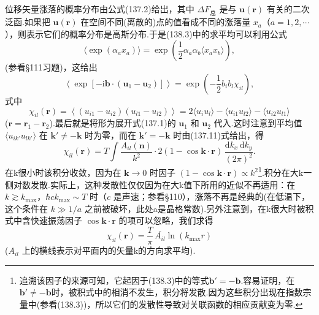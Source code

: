 位移矢量涨落的概率分布由公式(137.2)给出，其中 $\Delta F_{\text{总}}$ 是与 $\boldsymbol{u}(\boldsymbol{r})$ 有关的二次泛函.如果把 $\boldsymbol{u}(\boldsymbol{r})$ 在空间不同(离散的)点的值看成不同的涨落量 $x_a$（$a=1,2,\cdots$），则表示它们的概率分布是高斯分布.于是(138.3)中的求平均可以利用公式
\begin{equation*}
  \langle\exp(\alpha_ax_a)\rangle
  =\exp\left(\frac{1}{2}\alpha_a\alpha_b
  \langle x_ax_b\rangle\right),
\end{equation*}
(参看§111习题)，这给出
\begin{equation}
  \left\langle\exp[-\mathrm{i}\boldsymbol{b}\cdot(\boldsymbol{u}_1-\boldsymbol{u}_2)]\right\rangle
  =\exp\left(-\frac{1}{2}b_ib_l\chi_{il}\right),
\end{equation}
式中
\begin{equation*}
  \chi_{il}(\boldsymbol{r})=\left\langle(u_{i1}-u_{i2})(u_{l1}-u_{l2})\right\rangle
  =2\langle u_iu_l\rangle-\langle u_{i1}u_{l2}\rangle-\langle u_{i2}u_{l1}\rangle
\end{equation*}
($\boldsymbol{r}=\boldsymbol{r}_1-\boldsymbol{r}_2$).最后就是将形为展开式(137.1)的 $\boldsymbol{u}_1$ 和 $\boldsymbol{u}_2$ 代入.这时注意到平均值 $\langle u_{ik'}u_{lk'}\rangle$ 在 $\boldsymbol{k}'\neq-\boldsymbol{k}$ 时为零，而在 $\boldsymbol{k}'=-\boldsymbol{k}$ 时由(137.11)式给出，得
\begin{equation}
  \chi_{il}(\boldsymbol{r})=T\int\frac{A_{il}(\boldsymbol{n})}{k^2}\cdot
  2(1-\cos\boldsymbol{k}\cdot\boldsymbol{r})\,
  \frac{\mathrm{d}k_x\,\mathrm{d}k_y}{(2\pi)^2}.
\end{equation}
在k很小时该积分收敛，因为在 $\boldsymbol{k}\to0$ 时因子 $(1-\cos\boldsymbol{k}\cdot\boldsymbol{r})\propto k^2$\footnote{追溯该因子的来源可知，它起因于(138.3)中的等式$\boldsymbol{b}'=-\boldsymbol{b}$.容易证明，在$\boldsymbol{b}'\neq-\boldsymbol{b}$时，被积式中的相消不发生，积分将发散.因为这些积分出现在指数宗量中(参看(138.3))，所以它们的发散性导致对关联函数的相应贡献变为零.}.积分在大k一侧对数发散.实际上，这种发散性仅仅因为在大k值下所用的近似不再适用：在 $k\gtrsim k_{\max}$，$\hbar ck_{\max}\sim T$ 时（$c$ 是声速；参看§110），涨落不再是经典的(在低温下，这个条件在 $k\gg1/a$ 之前被破坏，此处a是晶格常数).另外注意到，在k很大时被积式中含快速振荡因子 $\cos\boldsymbol{k}\cdot\boldsymbol{r}$ 的项可以忽略，我们求得
\begin{equation}
  \chi_{il}(\boldsymbol{r})=\frac{T}{\pi}\,\overline{A_{il}}\ln(k_{\max}r)
\end{equation}
($A_{il}$ 上的横线表示对平面内的矢量k的方向求平均).

